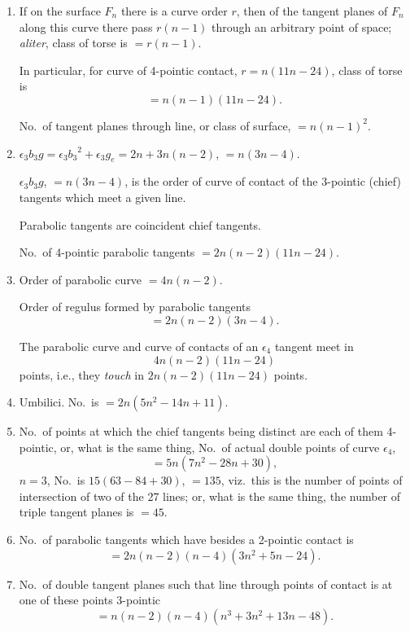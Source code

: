 \documentclass[11pt,a4paper,english]{article}
\theoremstyle{plain}
\begin{document}
\begin{enumerate}[label=\arabic*., start=25]
\item If on the surface $F_n$ there is a curve order $r$, then of the tangent planes of $F_n$ along this curve there pass $r(n-1)$ through an arbitrary point of space; \textit{aliter}, class of torse is $= r(n-1)$.

In particular, for curve of 4-pointic contact, $r = n(11n - 24)$, class of torse is
\[= n(n-1)(11n - 24).\]

No.\ of tangent planes through line, or class of surface, $= n(n-1)^2$.

\item $\epsilon_3 b_3 g = \epsilon_3{b_3}^2 + \epsilon_3 g_e = 2n + 3n(n-2)$, $= n(3n - 4)$.

$\epsilon_3 b_3 g$, $= n(3n - 4)$, is the order of curve of contact of the 3-pointic (chief) tangents which meet a given line.

Parabolic tangents are coincident chief tangents.

No.\ of 4-pointic parabolic tangents $= 2n(n-2)(11n - 24)$.

\item Order of parabolic curve $= 4n(n-2)$.

Order of regulus formed by parabolic tangents
\[= 2n(n-2)(3n - 4).\]

The parabolic curve and curve of contacts of an $\epsilon_4$ tangent meet in
\[4n(n-2)(11n - 24)\]
points, i.e., they \textit{touch} in $2n(n-2)(11n - 24)$ points.

\item Umbilici. No.\ is $= 2n(5n^2 - 14n + 11)$.

\item No.\ of points at which the chief tangents being distinct are each of them 4-pointic, or, what is the same thing, No.\ of actual double points of curve $\epsilon_4$,
\[= 5n(7n^2 - 28n + 30),\]
$n = 3$, No.\ is $15(63 - 84 + 30)$, $= 135$, viz.\ this is the number of points of intersection of two of the 27 lines; or, what is the same thing, the number of triple tangent planes is $= 45$.

\item No.\ of parabolic tangents which have besides a 2-pointic contact is
\[= 2n(n-2)(n-4)(3n^2 + 5n - 24).\]

\item No.\ of double tangent planes such that line through points of contact is at one of these points 3-pointic
\[= n(n-2)(n-4)(n^3 + 3n^2 + 13n - 48).\]


\end{enumerate}
\end{document}
